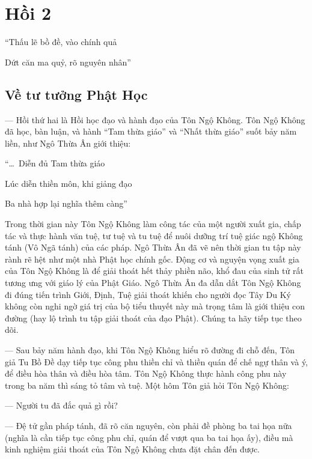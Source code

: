 \chapter{Hồi 2} %
\label{cha:hoi_2}


\begin{itshape}
``Thấu lẽ bồ đề, vào chính quả

Dứt căn ma quỷ, rõ nguyên nhân''
\end{itshape}

\section{Về tư tưởng Phật Học} %
\label{sec:2_tu_tuong_phat_hoc}

— Hồi thứ hai là Hồi học đạo và hành đạo của Tôn Ngộ Không. Tôn Ngộ Không đã học, bàn luận, và hành ``Tam thừa giáo'' và ``Nhất thừa giáo'' suốt bảy năm liền, như Ngô Thừa Ân giới thiệu:

\begin{itshape}
``\ldots ~Diễn đủ Tam thừa giáo

Lúc diễn thiền môn, khi giảng đạo

Ba nhà hợp lại nghĩa thêm càng''
\end{itshape}

Trong thời gian này Tôn Ngộ Không làm công tác của một người xuất gia, chấp tác và thực hành văn tuệ, tư tuệ và tu tuệ để nuôi dưỡng trí tuệ giác ngộ Không tánh (Vô Ngã tánh) của các pháp. Ngô Thừa Ân đã vẽ nên thời gian tu tập này rành rẽ hệt như một nhà Phật học chính gốc. Động cơ và nguyện vọng xuất gia của Tôn Ngộ Không là để giải thoát hết thảy phiền não, khổ đau của sinh tử rất tương ưng với giáo lý của Phật Giáo. Ngô Thừa Ân đa dẫn dắt Tôn Ngộ Không đi đúng tiến trình Giới, Định, Tuệ giải thoát khiến cho người đọc Tây Du Ký không còn nghi ngờ giá trị của bộ tiểu thuyết này mà trọng tâm là giới thiệu con đường (hay lộ trình tu tập giải thoát của đạo Phật). Chúng ta hãy tiếp tục theo dõi.

— Sau bảy năm hành đạo, khi Tôn Ngộ Không hiểu rõ đường đi chỗ đến, Tôn giả Tu Bồ Đề dạy tiếp tục công phu thiền chỉ và thiền quán để chế ngự thân và ý, để điều hòa thân và điều hòa tâm. Tôn Ngộ Không thực hành công phu này trong ba năm thì sáng tỏ tâm và tuệ. Một hôm Tôn giả hỏi Tôn Ngộ Không:

— Người tu đã đắc quả gì rồi?

— Đệ tử gần pháp tánh, đã rõ căn nguyên, còn phải đề phòng ba tai họa nữa (nghĩa là cần tiếp tục công phu chỉ, quán để vượt qua ba tai họa ấy), điều mà kinh nghiệm giải thoát của Tôn Ngộ Không chưa đặt chân đến được.

